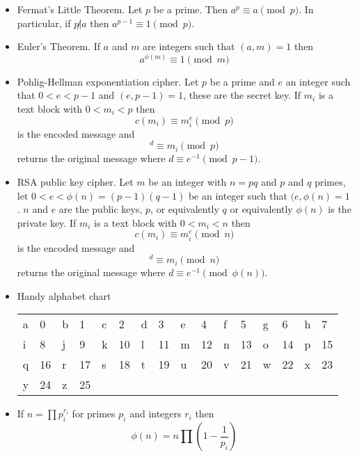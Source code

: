 \documentclass[12pt]{article}
\begin{document}
\begin{itemize}
\item Fermat's Little Theorem. Let $p$ be a prime. Then $a^p\equiv a\pmod p$. In particular, if $p\not|a$ then $a^{p-1}\equiv 1 \pmod p$.
\item Euler's Theorem. If $a$ and $m$ are integers such that $(a,m)=1$ then 
\begin{equation}
a^{\phi(m)}\equiv 1 \pmod m
\end{equation}
\item Pohlig-Hellman exponentiation cipher. Let $p$ be a prime and $e$
  an integer such that $0<e<p-1$ and $(e,p-1)=1$, these are the secret
  key. If $m_i$ is a text block with $0<m_i<p$ then
\begin{equation}
c(m_i)\equiv m_i^e\pmod{p}
\end{equation}
is the encoded message and
\begin{equation}
[c(m_i)]^d\equiv m_i\pmod{p}
\end{equation}
returns the original message where $d\equiv e^{-1}\pmod{p-1}$.
\item RSA public key cipher. Let $m$ be an integer with $n=pq$ and $p$ and $q$ primes, let $0<e<\phi(n)=(p-1)(q-1)$ be an integer such that $(e,\phi(n)=1$. $n$ and $e$ are the public keys, $p$, or equivalently $q$ or equivalently $\phi(n)$ is the private key. If $m_i$ is a text block with $0<m_i<n$ then
\begin{equation}
c(m_i)\equiv m_i^e\pmod{n}
\end{equation}
is the encoded message and
\begin{equation}
[c(m_i)]^d\equiv m_i\pmod{n}
\end{equation}
returns the original message where $d\equiv e^{-1}\pmod{\phi(n)}$.

\item Handy alphabet chart
\begin{center}
\begin{tabular}{ll|ll|ll|ll|ll|ll|ll|ll}
a&0&b&1&c&2&d&3&
e&4&f&5&g&6&h&7\\
i&8&j&9&k&10&l&11&
m&12&n&13&o&14&p&15\\
q&16&r&17&s&18&t&19&
u&20&v&21&w&22&x&23\\
y&24&z&25&&&&&&&&&&&&
\end{tabular}
\end{center}
\item If $n=\prod p_i^{r_i}$ for primes $p_i$ and integers $r_i$ then 
\begin{equation}
\phi(n)=n\prod\left(1-\frac{1}{p_i}\right)
\end{equation}
\end{itemize}
\end{document}
